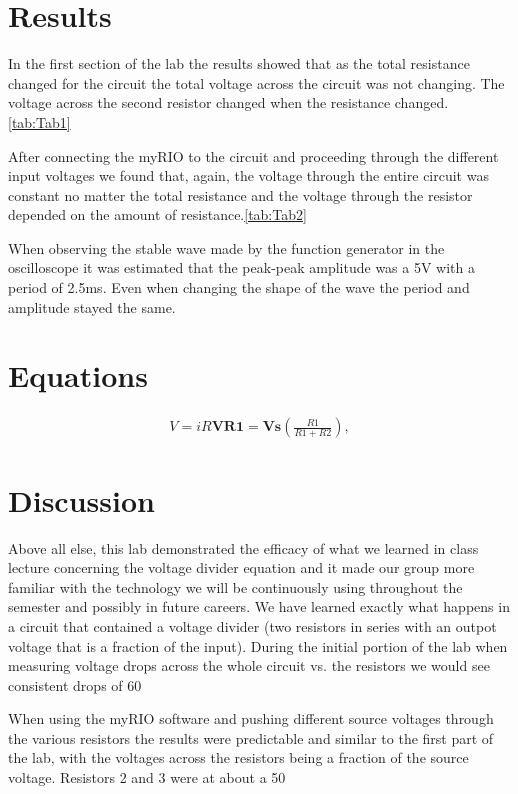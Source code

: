 \documentclass[10pt,twocolumn]{article}
\begin{document}
\section{Results}

 In the first section of the lab the results showed that as the total resistance changed for the circuit the total voltage across the circuit was not changing. The voltage across the second resistor changed when the resistance changed. \autoref{tab:Tab1}
 
 	After connecting the myRIO to the circuit and proceeding through the different input voltages we found that, again, the voltage through the entire circuit was constant no matter the total resistance and the voltage through the resistor depended on the amount of resistance.\autoref{tab:Tab2}
 	
 	When observing the stable wave made by the function generator in the oscilloscope it was estimated that the peak-peak amplitude was a 5V with a period of 2.5ms. Even when changing the shape of the wave the period and amplitude stayed the same.  
 	  
\section{Equations}


\begin{align}
V=iR


\bm{VR1} = \bm{Vs} 
    	\left(
        	\frac{R1}{R1+R2}
        \right), 
\end{align}
\section{Discussion}
Above all else, this lab demonstrated the efficacy of what we learned in class lecture concerning the voltage divider equation and it made our group more familiar with the technology we will be continuously using throughout the semester and possibly in future careers. We have learned exactly what happens in a circuit that contained a voltage divider (two resistors in series with an outpot voltage that is a fraction of the input). During the initial portion of the lab when measuring voltage drops across the whole circuit vs. the resistors we would see consistent drops of 60%

When using the myRIO software and pushing different source voltages through the various resistors the results were predictable and similar to the first part of the lab, with the voltages across the resistors being a fraction of the source voltage. Resistors 2 and 3 were at about a 50%
\end{document}
